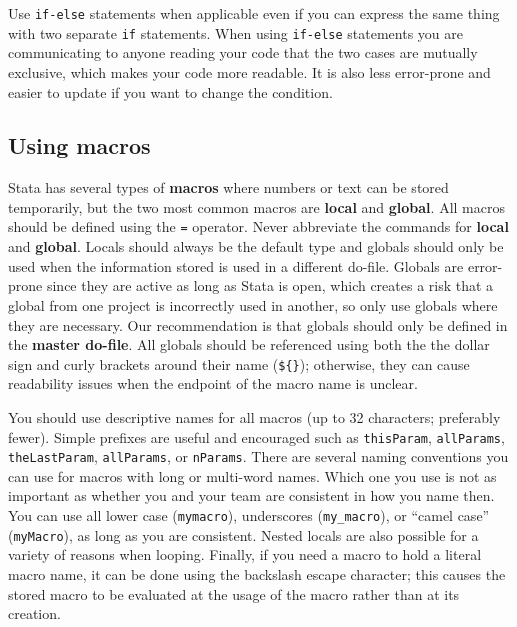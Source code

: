 
\noindent Use \texttt{if-else} statements when applicable
even if you can express the same thing with two separate \texttt{if} statements.
When using \texttt{if-else} statements you are communicating to anyone reading your code
that the two cases are mutually exclusive, which makes your code more readable.
It is also less error-prone and easier to update if you want to change the condition.


\subsection{Using macros}

Stata has several types of \textbf{macros} where numbers or text can be stored temporarily,
but the two most common macros are \textbf{local} and \textbf{global}.
All macros should be defined using the \texttt{=} operator.
Never abbreviate the commands for \textbf{local} and \textbf{global}.
Locals should always be the default type and globals should only
be used when the information stored is used in a different do-file.
Globals are error-prone since they are active as long as Stata is open,
which creates a risk that a global from one project is incorrectly used in another,
so only use globals where they are necessary.
Our recommendation is that globals should only be defined in the \textbf{master do-file}.
All globals should be referenced using both the the dollar sign and curly brackets around their name (\texttt{\$\{\}});
otherwise, they can cause readability issues when the endpoint of the macro name is unclear.

You should use descriptive names for all macros (up to 32 characters; preferably fewer).
Simple prefixes are useful and encouraged such as \texttt{thisParam}, \texttt{allParams},
\texttt{theLastParam}, \texttt{allParams}, or \texttt{nParams}.
There are several naming conventions you can use for macros with long or multi-word names.
Which one you use is not as important as whether you and your team are consistent in how you name then.
You can use all lower case (\texttt{mymacro}), underscores (\texttt{my\_macro}),
or ``camel case'' (\texttt{myMacro}), as long as you are consistent.
Nested locals are also possible for a variety of reasons when looping.
Finally, if you need a macro to hold a literal macro name,
it can be done using the backslash escape character;
this causes the stored macro to be evaluated
at the usage of the macro rather than at its creation.

